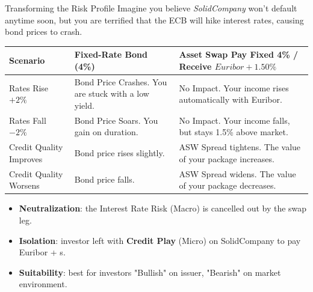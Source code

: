 \documentclass{beamer}
\begin{document}
\begin{frame}{Transforming the Risk Profile}
	Imagine you believe \emph{SolidCompany} won't default anytime soon, but you are terrified that the ECB will hike interest rates, causing bond prices to crash.

	\begin{table}[]
		\centering
		\scriptsize
		\begin{tabular}{|p{2cm}|p{6cm}|p{6cm}|}
			\hline
			\textbf{Scenario} & \textbf{Fixed-Rate Bond} (4\%) & \textbf{Asset Swap} Pay Fixed 4\% / Receive $Euribor + 1.50\%$ \\ \hline
			Rates Rise $+2\%$ & Bond Price Crashes. You are stuck with a low yield. & No Impact. Your income rises automatically with Euribor. \\ \hline
			Rates Fall $-2\%$	 & Bond Price Soars. You gain on duration. & No Impact. Your income falls, but stays 1.5\% above market. \\ \hline
			Credit Quality Improves & Bond price rises slightly. & ASW Spread tightens. The value of your package increases. \\ \hline
			Credit Quality Worsens & Bond price falls. & ASW Spread widens. The value of your package decreases. \\ \hline
		\end{tabular}
	\end{table}

    \begin{itemize}
        \item \textbf{Neutralization}: the \textcolor{maincolor}{Interest Rate Risk} (Macro) is cancelled out by the swap leg.
        \item \textbf{Isolation}: investor left with \textbf{Credit Play} (Micro) on SolidCompany to pay Euribor + s.
        \item \textbf{Suitability}: best for investors "Bullish" on issuer, "Bearish" on market environment.
    \end{itemize}
\end{frame}
\end{document}
